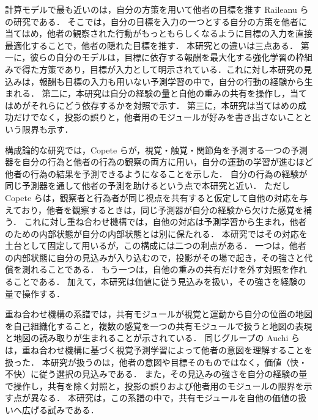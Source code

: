 計算モデルで最も近いのは，自分の方策を用いて他者の目標を推す Raileanu ら\cite{raileanu2018modeling}の研究である．
そこでは，自分の目標を入力の一つとする自分の方策を他者に当てはめ，他者の観察された行動がもっともらしくなるように目標の入力を直接最適化することで，他者の隠れた目標を推す．
本研究との違いは三点ある．
第一に，彼らの自分のモデルは，目標に依存する報酬を最大化する強化学習の枠組みで得た方策であり，目標が入力として明示されている．これに対し本研究の見込みは，報酬も目標の入力も用いない予測学習の中で，自分の行動の経験から生まれる．
第二に，本研究は自分の経験の量と自他の重みの共有を操作し，当てはめがそれらにどう依存するかを対照で示す．
第三に，本研究は当てはめの成功だけでなく，投影の誤りと，他者用のモジュールが好みを書き出さないことという限界も示す．

構成論的な研究では，Copete ら\cite{copete2016motor}が，視覚・触覚・関節角を予測する一つの予測器を自分の行為と他者の行為の観察の両方に用い，自分の運動の学習が進むほど他者の行為の結果を予測できるようになることを示した．
自分の行為の経験が同じ予測器を通して他者の予測を助けるという点で本研究と近い．
ただし Copete らは，観察者と行為者が同じ視点を共有すると仮定して自他の対応を与えており，他者を観察するときは，同じ予測器が自分の経験から欠けた感覚を補う．
これに対し重ね合わせ機構では，自他の対応は予測学習から生まれ\cite{noguchi2022superposition}，他者のための内部状態が自分の内部状態とは別に保たれる．
本研究ではその対応を土台として固定して用いるが，この構成には二つの利点がある．
一つは，他者の内部状態に自分の見込みが入り込むので，投影がその場で起き，その強さと代償を測れることである．
もう一つは，自他の重みの共有だけを外す対照を作れることである．
加えて，本研究は価値に従う見込みを扱い，その強さを経験の量で操作する．

重ね合わせ機構の系譜では，共有モジュールが視覚と運動から自分の位置の地図を自己組織化すること\cite{noguchi2017cognitive}，複数の感覚を一つの共有モジュールで扱うと地図の表現と地図の読み取りが生まれること\cite{noguchi2022multi}が示されている．
同じグループの Auchi ら\cite{auchi2022understanding}は，重ね合わせ機構に基づく視覚予測学習によって他者の意図を理解することを扱った．
本研究が扱うのは，他者の意図や目標そのものではなく，価値（快・不快）に従う選択の見込みである．
また，その見込みの強さを自分の経験の量で操作し，共有を除く対照と，投影の誤りおよび他者用のモジュールの限界を示す点が異なる．
本研究は，この系譜の中で，共有モジュールを自他の価値の扱いへ広げる試みである．


